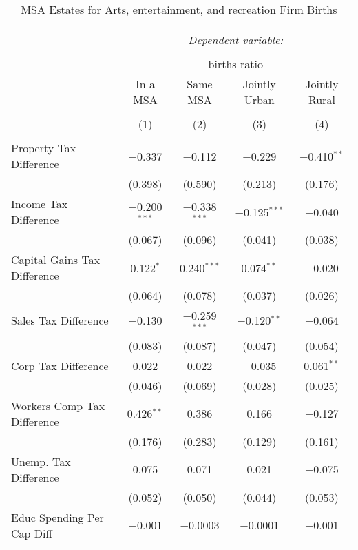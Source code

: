 
\begin{table}[!htbp] \centering 
  \caption{MSA Estates for  Arts, entertainment, and recreation Firm Births} 
  \label{71metro} 
\begin{tabular}{@{\extracolsep{5pt}}lcccc} 
\\[-1.8ex]\hline 
\hline \\[-1.8ex] 
 & \multicolumn{4}{c}{\textit{Dependent variable:}} \\ 
\cline{2-5} 
\\[-1.8ex] & \multicolumn{4}{c}{births ratio} \\ 
 & In a MSA & Same MSA & Jointly Urban & Jointly Rural \\ 
\\[-1.8ex] & (1) & (2) & (3) & (4)\\ 
\hline \\[-1.8ex] 
 Property Tax Difference & $-$0.337 & $-$0.112 & $-$0.229 & $-$0.410$^{**}$ \\ 
  & (0.398) & (0.590) & (0.213) & (0.176) \\ 
  Income Tax Difference & $-$0.200$^{***}$ & $-$0.338$^{***}$ & $-$0.125$^{***}$ & $-$0.040 \\ 
  & (0.067) & (0.096) & (0.041) & (0.038) \\ 
  Capital Gains Tax Difference & 0.122$^{*}$ & 0.240$^{***}$ & 0.074$^{**}$ & $-$0.020 \\ 
  & (0.064) & (0.078) & (0.037) & (0.026) \\ 
  Sales Tax Difference & $-$0.130 & $-$0.259$^{***}$ & $-$0.120$^{**}$ & $-$0.064 \\ 
  & (0.083) & (0.087) & (0.047) & (0.054) \\ 
  Corp Tax Difference & 0.022 & 0.022 & $-$0.035 & 0.061$^{**}$ \\ 
  & (0.046) & (0.069) & (0.028) & (0.025) \\ 
  Workers Comp Tax Difference & 0.426$^{**}$ & 0.386 & 0.166 & $-$0.127 \\ 
  & (0.176) & (0.283) & (0.129) & (0.161) \\ 
  Unemp. Tax Difference & 0.075 & 0.071 & 0.021 & $-$0.075 \\ 
  & (0.052) & (0.050) & (0.044) & (0.053) \\ 
  Educ Spending Per Cap Diff & $-$0.001 & $-$0.0003 & $-$0.0001 & $-$0.001 \\ 

\end{tabular}
\end{table}
